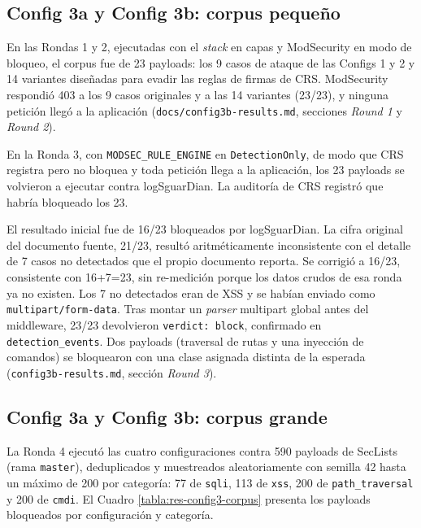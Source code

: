 \subsection{Config 3a y Config 3b: corpus pequeño}

En las Rondas 1 y 2, ejecutadas con el \textit{stack} en capas y ModSecurity\parencite{modsecurity} en modo de bloqueo, el corpus fue de 23 payloads: los 9 casos de ataque de las Configs 1 y 2 y 14 variantes diseñadas para evadir las reglas de firmas de CRS. ModSecurity respondió 403 a los 9 casos originales y a las 14 variantes (23/23), y ninguna petición llegó a la aplicación (\texttt{docs/config3b-results.md}, secciones \textit{Round 1} y \textit{Round 2}).

En la Ronda 3, con \texttt{MODSEC\_RULE\_ENGINE} en \texttt{DetectionOnly}, de modo que CRS registra pero no bloquea y toda petición llega a la aplicación, los 23 payloads se volvieron a ejecutar contra logSguarDian. La auditoría de CRS registró que habría bloqueado los 23. 

El resultado inicial fue de 16/23 bloqueados por logSguarDian. La cifra original del documento fuente, 21/23, resultó aritméticamente inconsistente con el detalle de 7 casos no detectados que el propio documento reporta. Se corrigió a 16/23, consistente con 16+7=23, sin re-medición porque los datos crudos de esa ronda ya no existen. Los 7 no detectados eran de XSS y se habían enviado como \texttt{multipart/form-data}. Tras montar un \textit{parser} multipart global antes del middleware, 23/23 devolvieron \texttt{verdict: block}, confirmado en \texttt{detection\_events}. Dos payloads (traversal de rutas y una inyección de comandos) se bloquearon con una clase asignada distinta de la esperada (\texttt{config3b-results.md}, sección \textit{Round 3}).

\subsection{Config 3a y Config 3b: corpus grande}

La Ronda 4 ejecutó las cuatro configuraciones contra 590 payloads de SecLists (rama \texttt{master}), deduplicados y muestreados aleatoriamente con semilla 42 hasta un máximo de 200 por categoría: 77 de \texttt{sqli}, 113 de \texttt{xss}, 200 de \texttt{path\_traversal} y 200 de \texttt{cmdi}. El Cuadro \ref{tabla:res-config3-corpus} presenta los payloads bloqueados por configuración y categoría.

